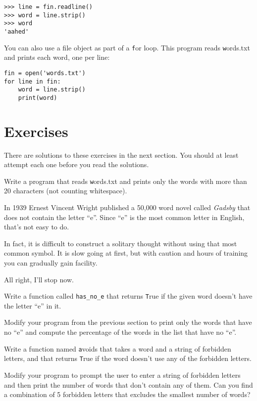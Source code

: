 \documentclass[
DIV=11,
fontsize=13,
twoside,
headinclude=false,
titlepage=firstiscover,
abstract=true,
headsepline=true,
footsepline=true,
chapterprefix=true, %
headings=big,
bibliography=totoc,%
captions=tableheading
]{scrbook}
\theoremstyle{definition}
\begin{document}
\begin{lstlisting}
>>> line = fin.readline()
>>> word = line.strip()
>>> word
'aahed'
\end{lstlisting}
%
You can also use a file object as part of a {\texttt for} loop.
This program reads {\texttt words.txt} and prints each word, one
per line:

\begin{lstlisting}
fin = open('words.txt')
for line in fin:
    word = line.strip()
    print(word)
\end{lstlisting}
%

\section{Exercises}

There are solutions to these exercises in the next section.
You should at least attempt each one before you read the solutions.

\begin{exercise}
\normalfont
Write a program that reads {\texttt words.txt} and prints only the
words with more than 20 characters (not counting whitespace).

\end{exercise}

\begin{exercise}
\normalfont

In 1939 Ernest Vincent Wright published a 50,000 word novel called
{\em Gadsby} that does not contain the letter ``e''.  Since ``e'' is
the most common letter in English, that's not easy to do.

In fact, it is difficult to construct a solitary thought without using
that most common symbol.  It is slow going at first, but with caution
and hours of training you can gradually gain facility.

All right, I'll stop now.

Write a function called \verb"has_no_e" that returns {\texttt True} if
the given word doesn't have the letter ``e'' in it.

Modify your program from the previous section to print only the words
that have no ``e'' and compute the percentage of the words in the list
that have no ``e''.

\end{exercise}


\begin{exercise}
\normalfont 

Write a function named {\texttt avoids}
that takes a word and a string of forbidden letters, and
that returns {\texttt True} if the word doesn't use any of the forbidden
letters.

Modify your program to prompt the user to enter a string
of forbidden letters and then print the number of words that
don't contain any of them.
Can you find a combination of 5 forbidden letters that
excludes the smallest number of words?

\end{exercise}
\end{document}
